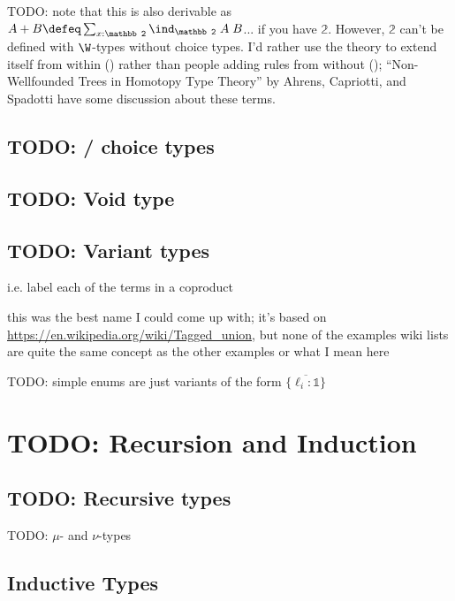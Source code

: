 \documentclass[11pt]{article} %
\theoremstyle{definition}
\theoremstyle{remark}
\begin{document}
TODO: note that this is also derivable as $A + B \defeq \sum_{x:\mathbb 2}\ind_\mathbb 2\;A\;B$... if you have $\mathbb 2$.
However, $\mathbb 2$ can't be defined with $\W$-types without choice types.
I'd rather use the theory to extend itself from within () rather than people adding rules from without (); ``Non-Wellfounded Trees in Homotopy Type Theory'' by Ahrens, Capriotti, and Spadotti have some discussion about these terms.

\subsection{TODO: \Nary/ choice types}

\subsection{TODO: Void type}
\label{subsec:void-type}

\subsection{TODO: Variant types}

i.e. label each of the terms in a coproduct

this was the best name I could come up with; it's based on \url{https://en.wikipedia.org/wiki/Tagged_union}, but none of the examples wiki lists are quite the same concept as the other examples or what I mean here


TODO: simple enums are just variants of the form $\{\overline{\ell_i\colon \mathbb 1}\}$



\section{TODO: Recursion and Induction}
\label{sec:ind-types}
\subsection{TODO: Recursive types}
TODO: $\mu$- and $\nu$-types

\subsection{Inductive Types}
\end{document}
